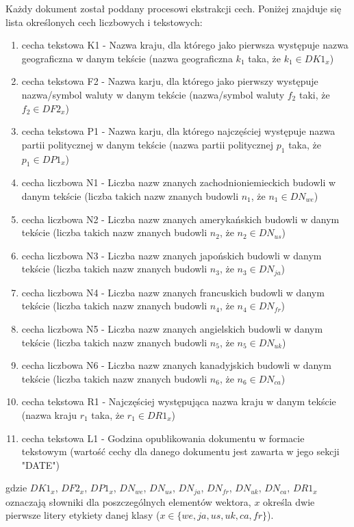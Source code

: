 \documentclass{classrep}
\begin{document}
Każdy dokument został poddany procesowi ekstrakcji cech.
Poniżej znajduje się lista określonych cech liczbowych i tekstowych:
\begin{enumerate}
\item cecha tekstowa K1 - Nazwa kraju, dla którego jako pierwsza występuje nazwa geograficzna w danym tekście (nazwa geograficzna $k_1$ taka, że $k_1 \in DK1_x$)
\item cecha tekstowa F2 - Nazwa karju, dla którego jako pierwszy występuje nazwa/symbol waluty w danym tekście (nazwa/symbol waluty $f_2$ taki, że $f_2 \in DF2_x$)
\item cecha tekstowa P1 - Nazwa karju, dla którego najczęściej występuje nazwa partii politycznej w danym tekście (nazwa partii politycznej $p_1$ taka, że $p_1 \in DP1_x$)
\item cecha liczbowa N1 - Liczba nazw znanych zachodnioniemieckich budowli w danym tekście (liczba takich nazw znanych budowli $n_1$, że $n_1 \in DN_{we}$)
\item cecha liczbowa N2 - Liczba nazw znanych amerykańskich budowli w danym tekście (liczba takich nazw znanych budowli $n_2$, że $n_2 \in DN_{us}$)
\item cecha liczbowa N3 - Liczba nazw znanych japońskich budowli w danym tekście (liczba takich nazw znanych budowli $n_3$, że $n_3 \in DN_{ja}$)
\item cecha liczbowa N4 - Liczba nazw znanych francuskich budowli w danym tekście (liczba takich nazw znanych budowli $n_4$, że $n_4 \in DN_{fr}$)
\item cecha liczbowa N5 - Liczba nazw znanych angielskich budowli w danym tekście (liczba takich nazw znanych budowli $n_5$, że $n_5 \in DN_{uk}$)
\item cecha liczbowa N6 - Liczba nazw znanych kanadyjskich budowli w danym tekście (liczba takich nazw znanych budowli $n_6$, że $n_6 \in DN_{ca}$)
\item cecha tekstowa R1 - Najczęściej występująca nazwa kraju w danym tekście (nazwa kraju $r_1$ taka, że $r_1 \in DR1_x$)
\item cecha tekstowa L1 - Godzina opublikowania dokumentu w formacie tekstowym (wartość cechy dla danego dokumentu jest zawarta w jego sekcji "DATE")\\
\end{enumerate}
gdzie $DK1_x$, $DF2_x$, $DP1_x$, $DN_{we}$, $DN_{us}$, $DN_{ja}$, $DN_{fr}$, $DN_{uk}$, $DN_{ca}$, $DR1_x$ oznaczają słowniki dla poszczególnych elementów wektora, \(x\) określa dwie pierwsze litery etykiety danej klasy (\(x \in \{we, ja, us, uk, ca, fr\}\)).
\end{document}
